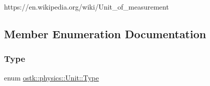 https\+://en.wikipedia.\+org/wiki/\+Unit\+\_\+of\+\_\+measurement 

\subsection{Member Enumeration Documentation}
\mbox{\label{classostk_1_1physics_1_1_unit_a1c07d36cd02be8541eb972367e2b628f}} 
\subsubsection{\texorpdfstring{Type}{Type}}
{\footnotesize\ttfamily enum \hyperlink{classostk_1_1physics_1_1_unit_a1c07d36cd02be8541eb972367e2b628f}{ostk\+::physics\+::\+Unit\+::\+Type}\hspace{0.3cm}{\ttfamily [strong]}}


